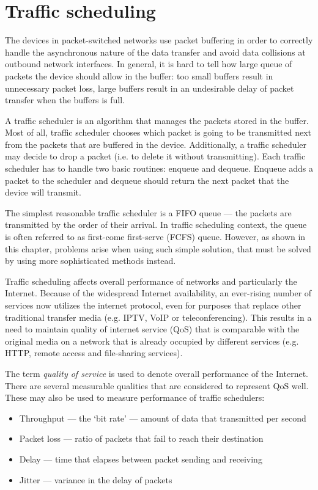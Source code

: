 \chapter{Traffic scheduling}
\label{chap1}

The devices in packet-switched networks use packet buffering in order to correctly handle the asynchronous nature of the data transfer and avoid data collisions at outbound network interfaces. In general, it is hard to tell how large queue of packets the device should allow in the buffer: too small buffers result in unnecessary packet loss, large buffers result in an undesirable delay of packet transfer when the buffers is full.

A traffic scheduler is an algorithm that manages the packets stored in the buffer. Most of all, traffic scheduler chooses which packet is going to be transmitted next from the packets that are buffered in the device. Additionally, a traffic scheduler may decide to drop a packet (i.e. to delete it without transmitting). Each traffic scheduler has to handle two basic routines: enqueue and dequeue. Enqueue adds a packet to the scheduler and dequeue should return the next packet that the device will transmit.

The simplest reasonable traffic scheduler is a FIFO queue --- the packets are transmitted by the order of their arrival. In traffic scheduling context, the queue is often referred to as first-come first-serve (FCFS) queue. However, as shown in this chapter, problems arise when using such simple solution, that must be solved by using more sophisticated methods instead.

Traffic scheduling affects overall performance of networks and particularly the Internet. Because of the widespread Internet availability, an ever-rising number of services now utilizes the internet protocol, even for purposes that replace other traditional transfer media (e.g. IPTV, VoIP or teleconferencing). This results in a need to maintain quality of internet service (QoS) that is comparable with the original media on a network that is already occupied by different services (e.g. HTTP, remote access and file-sharing services).

The term \emph{quality of service} is used to denote overall performance of the Internet. There are several measurable qualities that are considered to represent QoS well. These may also be used to measure performance of traffic schedulers:
\begin{itemize}
	\item Throughput --- the `bit rate' --- amount of data that transmitted per second
	\item Packet loss --- ratio of packets that fail to reach their destination
	\item Delay --- time that elapses between packet sending and receiving
	\item Jitter --- variance in the delay of packets
\end{itemize}

